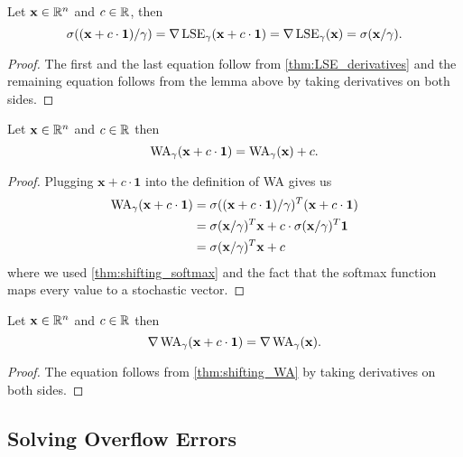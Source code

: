 \begin{corollary} \label{thm:shifting_softmax}
 Let \(\mathbf{x} \in \mathbb{R}^n\) and \(c \in \mathbb{R}\), then
 \[ \sigma((\mathbf{x} + c \cdot \mathbf{1})/\gamma) = \nabla \operatorname{LSE}_\gamma(\mathbf{x} + c \cdot \mathbf{1}) = \nabla \operatorname{LSE}_\gamma(\mathbf{x}) = \sigma(\mathbf{x}/\gamma) . \] 
\end{corollary}

\begin{proof}
 The first and the last equation follow from \cref{thm:LSE_derivatives} and the remaining equation follows from the lemma above by taking derivatives on both sides.
\end{proof}


\begin{lemma} \label{thm:shifting_WA}
 Let \(\mathbf{x} \in \mathbb{R}^n\) and \(c \in \mathbb{R}\) then
 \[ \operatorname{WA}_\gamma(\mathbf{x} + c \cdot \mathbf{1}) = \operatorname{WA}_\gamma(\mathbf{x}) + c .\]
\end{lemma}

\begin{proof}
 Plugging \(\mathbf{x} + c \cdot \mathbf{1}\) into the definition of WA gives us
 \begin{align*}
     \operatorname{WA}_\gamma(\mathbf{x} + c \cdot \mathbf{1})
  &= \sigma((\mathbf{x} + c \cdot \mathbf{1})/\gamma)^T (\mathbf{x} + c \cdot \mathbf{1}) \\
  &= \sigma(\mathbf{x}/\gamma)^T \mathbf{x} + c \cdot \sigma(\mathbf{x}/\gamma)^T \mathbf{1} \\
  &= \sigma(\mathbf{x}/\gamma)^T \mathbf{x} + c
 \end{align*}
 where we used \cref{thm:shifting_softmax} and the fact that the softmax function maps every value to a stochastic vector.
\end{proof}


\begin{corollary} \label{thm:shifting_gradient_of_WA}
 Let \(\mathbf{x} \in \mathbb{R}^n\) and \(c \in \mathbb{R}\) then
 \[ \nabla \operatorname{WA}_\gamma(\mathbf{x} + c \cdot \mathbf{1}) = \nabla \operatorname{WA}_\gamma(\mathbf{x}) .\]
\end{corollary}

\begin{proof}
 The equation follows from \cref{thm:shifting_WA} by taking derivatives on both sides.
\end{proof}



\subsection{Solving Overflow Errors} \label{sec:solving_overflow_errors}

